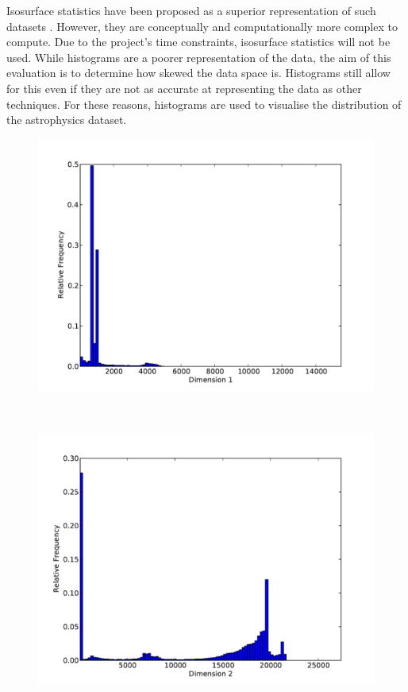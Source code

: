 Isosurface statistics have been proposed as a superior representation of such datasets \cite{histograms-and-isosurfaces}. However, they are conceptually and computationally more complex to compute. Due to the project's time constraints, isosurface statistics will not be used. While histograms are a poorer representation of the data, the aim of this evaluation is to determine how skewed the data space is. Histograms still allow for this even if they are not as accurate at representing the data as other techniques. For these reasons, histograms are used to visualise the distribution of the astrophysics dataset.

\begin{figure}
	\begin{center}
		\begin{subfloat}{%
			\includegraphics[scale=0.36]{figures/histograms/astrophysics_500000_0.pdf}
		}
		\end{subfloat}~
		\begin{subfloat}{%
			\includegraphics[scale=0.36]{figures/histograms/astrophysics_500000_1.pdf}
		}
		\end{subfloat}
	\end{center}


\end{figure}
